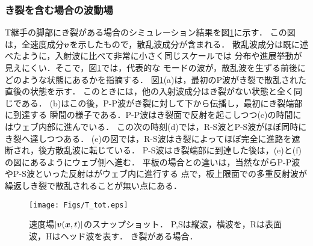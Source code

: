 \subsubsection{き裂を含む場合の波動場}
T継手の脚部にき裂がある場合のシミュレーション結果を図\ref{fig:fig3_6}に示す．
この図は，全速度成分$\mbox{\boldmath $v$}$を示したもので，散乱波成分が含まれる．
散乱波成分は既に述べたように，入射波に比べて非常に小さく同じスケールでは
分布や進展挙動が見えにくい．そこで，図\ref{fig:fig3_6}では，代表的な
モードの波が，散乱波を生ずる前後にどのような状態にあるかを指摘する．
図\ref{fig:fig3_6}(a)は，最初のP波がき裂で散乱された直後の状態を示す．
このときには，他の入射波成分はき裂がない状態と全く同じである．
(b)はこの後，P-P波がき裂に対して下から伝播し，最初にき裂端部に到達する
瞬間の様子である．P-P波はき裂面で反射を起こしつつ(c)の時間にはウェブ内部に進んでいる．
この次の時刻(d)では，R-S波とP-S波がほぼ同時にき裂へ達しつつある．
(e)の図では，R-S波はき裂によってほぼ完全に進路を遮断され，後方散乱波に転じている．
P-S波はき裂端部に到達した後は，(e)と(f)の図にあるようにウェブ側へ進む．
平板の場合との違いは，当然ながらP-P波やP-S波といった反射はがウェブ内に進行する
点で，板上限面での多重反射波が繰返しき裂で散乱されることが無い点にある．
\begin{figure}[h]
	\begin{center}
	\texttt{[image: Figs/T\_tot.eps]} 
	\end{center}
	\caption{
		速度場$|\mbox{\boldmath $v$}(\mbox{\boldmath $x$},t)|$のスナップショット．
		P,Sは縦波，横波を，Rは表面波，Hはヘッド波を表す．
		き裂がある場合．
	} 
	\label{fig:fig3_6}
\end{figure}
